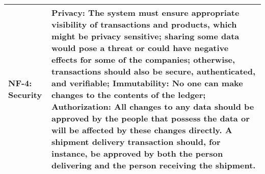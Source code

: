 \begin{table}[H]
\begin{tabular}{|p{3cm}|p{12cm}|}
\hline
NF-4: Security & 
\textbf{Privacy}: The system must ensure appropriate visibility of transactions and products, which might be privacy sensitive; sharing some data would pose a threat or could have negative effects for some of the companies; otherwise, transactions should also be secure, authenticated, and verifiable; \newline
\textbf{Immutability}: No one can make changes to the contents of the ledger;\newline
\textbf{Authorization}: All changes to any data should be approved by the people that possess the data or will be affected by these changes directly. A shipment delivery transaction should, for instance, be approved by both the person delivering and the person receiving the shipment. \\
\hline
\end{tabular}
\end{table}